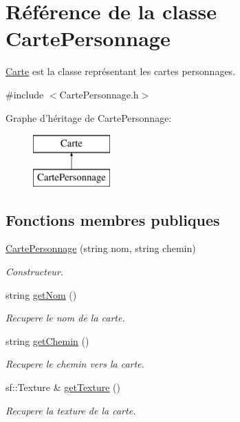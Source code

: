 \hypertarget{classCartePersonnage}{\section{\-Référence de la classe \-Carte\-Personnage}
\label{classCartePersonnage}
}


\hyperlink{classCarte}{\-Carte} est la classe représentant les cartes personnages.  




{\ttfamily \#include $<$\-Carte\-Personnage.\-h$>$}

\-Graphe d'héritage de \-Carte\-Personnage\-:\begin{figure}[H]
\begin{center}
\leavevmode
\includegraphics[height=2.000000cm]{classCartePersonnage}
\end{center}
\end{figure}
\subsection*{\-Fonctions membres publiques}
\begin{DoxyCompactItemize}
\item 
\hypertarget{classCartePersonnage_a3119bd945abe416b38e6c2df7265db89}{\hyperlink{classCartePersonnage_a3119bd945abe416b38e6c2df7265db89}{\-Carte\-Personnage} (string nom, string chemin)}\label{classCartePersonnage_a3119bd945abe416b38e6c2df7265db89}

\begin{DoxyCompactList}\small\item\em \-Constructeur. \end{DoxyCompactList}\item 
string \hyperlink{classCartePersonnage_ab89bb1837aebcbe48e5356579523b695}{get\-Nom} ()
\begin{DoxyCompactList}\small\item\em \-Recupere le nom de la carte. \end{DoxyCompactList}\item 
string \hyperlink{classCartePersonnage_a7767678c9ba3703f8e17a4469309d77e}{get\-Chemin} ()
\begin{DoxyCompactList}\small\item\em \-Recupere le chemin vers la carte. \end{DoxyCompactList}\item 
sf\-::\-Texture \& \hyperlink{classCartePersonnage_a3ec927c067fff46b9ba8999d946c50e2}{get\-Texture} ()
\begin{DoxyCompactList}\small\item\em \-Recupere la texture de la carte. \end{DoxyCompactList}\end{DoxyCompactItemize}


